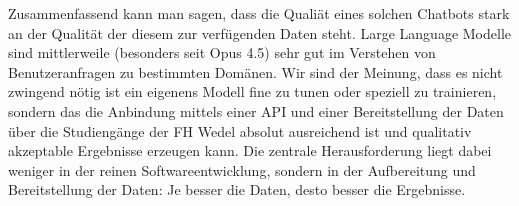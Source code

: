 Zusammenfassend kann man sagen, dass die Qualiät eines solchen Chatbots stark an der Qualität der diesem
zur verfügenden Daten steht. Large Language Modelle sind mittlerweile (besonders seit Opus 4.5) 
sehr gut im Verstehen von Benutzeranfragen zu bestimmten Domänen. Wir sind der Meinung, dass es nicht
zwingend nötig ist ein eigenens Modell fine zu tunen oder speziell zu trainieren, sondern das die Anbindung 
mittels einer API und einer Bereitstellung der Daten über die Studiengänge der FH Wedel absolut ausreichend ist und
qualitativ akzeptable Ergebnisse erzeugen kann. Die zentrale Herausforderung liegt dabei weniger in der
reinen Softwareentwicklung, sondern in der Aufbereitung und Bereitstellung der Daten: Je besser die Daten,
desto besser die Ergebnisse.